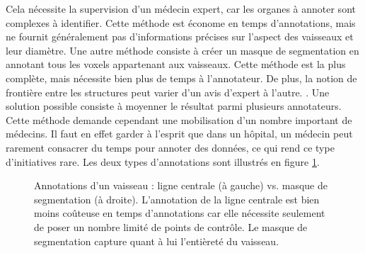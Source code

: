  Cela nécessite la supervision d'un médecin expert, car les organes à annoter sont complexes à identifier.  Cette méthode est économe en temps d'annotations, mais ne fournit généralement pas d'informations précises sur l'aspect des vaisseaux et leur diamètre. 
Une autre méthode consiste à créer un masque de segmentation en annotant tous les voxels appartenant aux vaisseaux. Cette méthode est la plus complète, mais nécessite bien plus de temps à l'annotateur. De plus, la notion de frontière entre les structures peut varier d'un avis d'expert à l'autre. . Une solution possible consiste à moyenner le résultat parmi plusieurs annotateurs. Cette méthode demande cependant une mobilisation d'un nombre important de médecins. Il faut en effet garder à l'esprit que dans un hôpital, un médecin peut rarement consacrer du temps pour annoter des données, ce qui rend ce type d'initiatives rare. Les deux types d'annotations sont illustrés en figure \ref{fig:annotations}. 
\begin{figure}
    \caption{Annotations d'un vaisseau : ligne centrale (à gauche) vs. masque de segmentation (à droite). L'annotation de la ligne centrale est bien moins coûteuse en temps d'annotations car elle nécessite seulement de poser un nombre limité de points de contrôle. Le masque de segmentation capture quant à lui l'entièreté du vaisseau.}
    \label{fig:annotations}
\end{figure}

